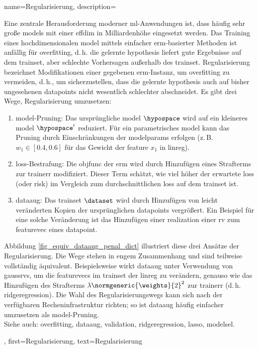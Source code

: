 {{{{
{name={Regularisierung}, 
 description={Eine zentrale Herausforderung moderner \gls{ml}-Anwendungen ist, dass häufig sehr große \glspl{model} mit einer 
  \gls{effdim} in Milliardenhöhe eingesetzt werden. Das Training eines hochdimensionalen \gls{model} 
  mittels einfacher \gls{erm}-basierter Methoden ist anfällig für \gls{overfitting}, d.\,h. die gelernte 
  \gls{hypothesis} liefert gute Ergebnisse auf dem \gls{trainset}, aber schlechte Vorhersagen außerhalb des \gls{trainset}. 
  Regularisierung bezeichnet Modifikationen einer gegebenen \gls{erm}-Instanz, um \gls{overfitting} zu vermeiden, 
  d.\,h., um sicherzustellen, dass die gelernte \gls{hypothesis} auch auf bisher ungesehenen \glspl{datapoint} 
  nicht wesentlich schlechter abschneidet. Es gibt drei Wege, Regularisierung umzusetzen:
  \begin{enumerate}[label=\arabic*)]
   \item {\Gls{model}-Pruning:} Das ursprüngliche \gls{model} $\hypospace$ wird auf ein kleineres \gls{model} $\hypospace'$ reduziert. 
   Für ein parametrisches \gls{model} kann das Pruning durch Einschränkungen der \glspl{modelparam} erfolgen 
   (z.\,B. $w_{1} \in [0.4,0.6]$ für das Gewicht der \gls{feature} $x_{1}$ in \gls{linreg}).
   \item {\Gls{loss}-Bestrafung:} Die \gls{objfunc} der \gls{erm} wird durch Hinzufügen eines Strafterms zur \gls{trainerr} 
   modifiziert. Dieser Term schätzt, wie viel höher der erwartete \gls{loss} (oder \gls{risk}) im Vergleich zum 
   durchschnittlichen \gls{loss} auf dem \gls{trainset} ist.
   \item {\Gls{dataaug}:} Das \gls{trainset} $\dataset$ wird durch Hinzufügen von leicht veränderten Kopien der 
   ursprünglichen \glspl{datapoint} vergrößert. Ein Beispiel für eine solche Veränderung ist das Hinzufügen einer 
   \gls{realization} einer \gls{rv} zum \gls{featurevec} eines \gls{datapoint}.
  \end{enumerate}
  Abbildung \ref{fig_equiv_dataaug_penal_dict} illustriert diese drei Ansätze der Regularisierung. 
  Die Wege stehen in engem Zusammenhang und sind teilweise vollständig äquivalent. Beispielsweise wirkt 
  \gls{dataaug} unter Verwendung von \glspl{gaussrv}, um die \glspl{featurevec} im \gls{trainset} der 
  \gls{linreg} zu verändern, genauso wie das Hinzufügen des Strafterms $\lambda \normgeneric{\weights}{2}^2$ 
  zur \gls{trainerr} (d.\,h. \gls{ridgeregression}). Die Wahl des Regularisierungswegs kann sich nach der 
  verfügbaren Recheninfrastruktur richten; so ist \gls{dataaug} häufig einfacher umzusetzen als \gls{model}-Pruning.
   \\
  Siehe auch: \gls{overfitting}, \gls{dataaug}, \gls{validation}, \gls{ridgeregression}, \gls{lasso}, \gls{modelsel}. },
 first={Regularisierung},
 text={Regularisierung}
}

}}}}
